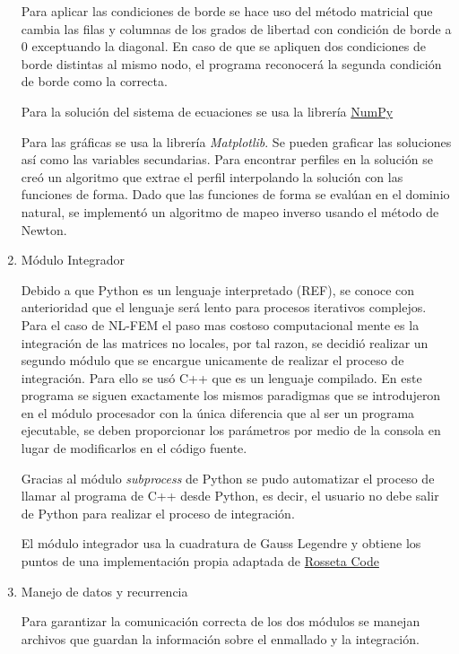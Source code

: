 \begin{enumerate}
				Para aplicar las condiciones de borde se hace uso del método matricial que cambia las filas y columnas de los grados de libertad con condición de borde a 0 exceptuando la diagonal. En caso de que se apliquen dos condiciones de borde distintas al mismo nodo, el programa reconocerá la segunda condición de borde como la correcta.

				Para la solución del sistema de ecuaciones se usa la librería \href{https://numpy.org/doc/stable/reference/generated/numpy.linalg.solve.html}{NumPy}

				Para las gráficas se usa la librería \textit{Matplotlib}. Se pueden graficar las soluciones así como las variables secundarias. Para encontrar perfiles en la solución se creó un algoritmo que extrae el perfil interpolando la solución con las funciones de forma. Dado que las funciones de forma se evalúan en el dominio natural, se implementó un algoritmo de mapeo inverso usando el método de Newton.

				\item Módulo Integrador

				Debido a que Python es un lenguaje interpretado (REF), se conoce con anterioridad que el lenguaje será lento para procesos iterativos complejos. Para el caso de NL-FEM el paso mas costoso computacional mente es la integración de las matrices no locales, por tal razon, se decidió realizar un segundo módulo que se encargue unicamente de realizar el proceso de integración. Para ello se usó C++ que es un lenguaje compilado. En este programa se siguen exactamente los mismos paradigmas que se introdujeron en el módulo procesador con la única diferencia que al ser un programa ejecutable, se deben proporcionar los parámetros por medio de la consola en lugar de modificarlos en el código fuente.

				Gracias al módulo \textit{subprocess} de Python se pudo automatizar el proceso de llamar al programa de C++ desde Python, es decir, el usuario no debe salir de Python para realizar el proceso de integración.

				El módulo integrador usa la cuadratura de Gauss Legendre y obtiene los puntos de una implementación propia adaptada de \href{http://www.rosettacode.org/wiki/Numerical_integration/Gauss-Legendre_Quadrature}{Rosseta Code}
				\item Manejo de datos y recurrencia

				Para garantizar la comunicación correcta de los dos módulos se manejan archivos que guardan la información sobre el enmallado y la integración.


\end{enumerate}
